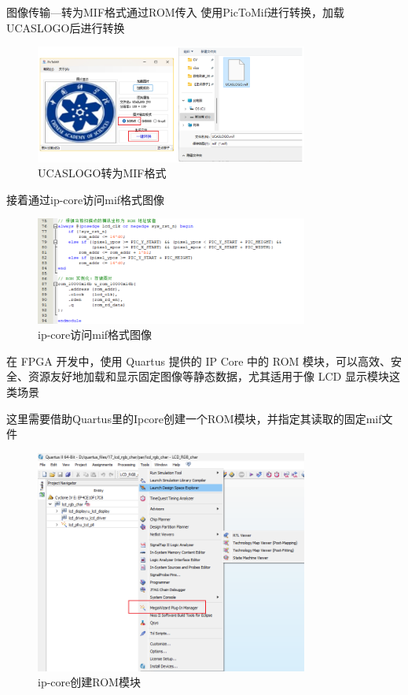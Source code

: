 \documentclass[UTF8]{article}
\theoremstyle{MyLineTheoremStyle} %
\theoremstyle{MyBlockTheoremStyle} %
\theoremstyle{MySubsubsectionStyle} %
\begin{document}
图像传输—转为MIF格式通过ROM传入
使用PicToMif进行转换，加载UCASLOGO后进行转换

\begin{figure}[H]
    \centering
    \includegraphics[width=0.8\textwidth]{UCASLOGO_transfer.png}
    \caption{UCASLOGO转为MIF格式}
    \label{fig:UCASLOGO转为MIF格式}
\end{figure}

接着通过ip-core访问mif格式图像
\begin{figure}[H]
    \centering
    \includegraphics[width=0.8\textwidth]{ip-core.png}
    \caption{ip-core访问mif格式图像}
    \label{fig:ip-core访问mif格式图像}
\end{figure}


在 FPGA 开发中，使用 Quartus 提供的 IP Core 中的 ROM 模块，可以高效、安全、资源友好地加载和显示固定图像等静态数据，尤其适用于像 LCD 显示模块这类场景

这里需要借助Quartus里的Ipcore创建一个ROM模块，并指定其读取的固定mif文件

\begin{figure}[H]
    \centering
    \includegraphics[width=0.8\textwidth]{ip-core2.png}
    \caption{ip-core创建ROM模块}
    \label{fig:ip-core创建ROM模块}
\end{figure}
\end{document}

